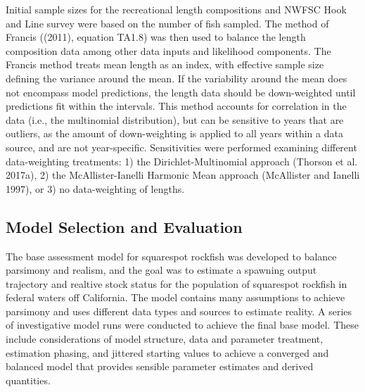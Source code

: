 \documentclass[11pt,
  english,
  a4paper,
]{article}
\begin{document}
\leavevmode\tagmcend\tagstructend\par


Initial sample sizes for the recreational length compositions and NWFSC Hook and Line survey were based on the number of fish sampled. The method of Francis ({(2011)\leavevmode\tagmcend\tagstructend}, equation TA1.8) was then used to balance the length composition data among other data inputs and likelihood components. The Francis method treats mean length as an index, with effective sample size defining the variance around the mean. If the variability around the mean does not encompass model predictions, the length data should be down-weighted until predictions fit within the intervals. This method accounts for correlation in the data (i.e., the multinomial distribution), but can be sensitive to years that are outliers, as the amount of down-weighting is applied to all years within a data source, and are not year-specific. Sensitivities were performed examining different data-weighting treatments: 1) the Dirichlet-Multinomial approach {(Thorson et al. 2017a)\leavevmode\tagmcend\tagstructend}, 2) the McAllister-Ianelli Harmonic Mean approach {(McAllister and Ianelli 1997)\leavevmode\tagmcend\tagstructend}, or 3) no data-weighting of lengths.

\leavevmode\tagmcend\tagstructend\par


\hypertarget{model-selection-and-evaluation}{%
\subsection{Model Selection and Evaluation}\label{model-selection-and-evaluation}}

\leavevmode\tagmcend\tagstructend


The base assessment model for squarespot rockfish was developed to balance parsimony and realism, and the goal was to estimate a spawning output trajectory and realtive stock status for the population of squarespot rockfish in federal waters off California. The model contains many assumptions to achieve parsimony and uses different data types and sources to estimate reality. A series of investigative model runs were conducted to achieve the final base model. These include considerations of model structure, data and parameter treatment, estimation phasing, and jittered starting values to achieve a converged and balanced model that provides sensible parameter estimates and derived quantities.
\end{document}

